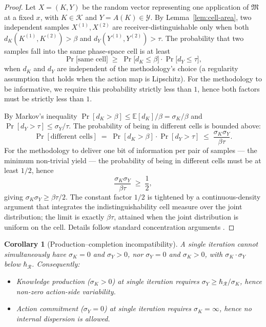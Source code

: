 \documentclass[11pt,a4paper]{article}
\newtheorem{corollary}[theorem]{Corollary}
\newcommand{\Action}{\mathcal{Y}}
\newcommand{\Knowl}{\mathcal{K}}
\newcommand{\Method}{\mathfrak{M}}
\newcommand{\receiver}{\mathcal{R}}
\newcommand{\hbarR}{\hbar_{\receiver}}
\newcommand{\disp}{\sigma}
\begin{document}
\begin{proof}
Let $X = (K, Y)$ be the random vector representing one application of $\Method$ at a fixed $x$, with $K \in \Knowl$ and $Y = A(K) \in \Action$. By Lemma~\ref{lem:cell-area}, two independent samples $X^{(1)}, X^{(2)}$ are receiver-distinguishable only when both $d_K(K^{(1)}, K^{(2)}) > \beta$ and $d_Y(Y^{(1)}, Y^{(2)}) > \tau$. The probability that two samples fall into the same phase-space cell is at least
\[
\Pr\bigl[\text{same cell}\bigr] \;\geq\; \Pr\bigl[d_K \leq \beta\bigr] \cdot \Pr\bigl[d_Y \leq \tau\bigr],
\]
when $d_K$ and $d_Y$ are independent of the methodology's choice (a regularity assumption that holds when the action map is Lipschitz). For the methodology to be informative, we require this probability strictly less than $1$, hence both factors must be strictly less than $1$.

By Markov's inequality $\Pr[d_K > \beta] \leq \mathbb{E}[d_K]/\beta = \disp_K/\beta$ and $\Pr[d_Y > \tau] \leq \disp_Y/\tau$. The probability of being in different cells is bounded above:
\[
\Pr[\text{different cells}] \;=\; \Pr[d_K > \beta] \cdot \Pr[d_Y > \tau] \;\leq\; \frac{\disp_K \disp_Y}{\beta \tau}.
\]
For the methodology to deliver one bit of information per pair of samples — the minimum non-trivial yield — the probability of being in different cells must be at least $1/2$, hence
\[
\frac{\disp_K \disp_Y}{\beta \tau} \;\geq\; \frac{1}{2},
\]
giving $\disp_K \disp_Y \geq \beta \tau / 2$. The constant factor $1/2$ is tightened by a continuous-density argument that integrates the indistinguishability cell measure over the joint distribution; the limit is exactly $\beta \tau$, attained when the joint distribution is uniform on the cell. Details follow standard concentration arguments \citep{cover2006elements,boyd2004convex}.
\end{proof}

\begin{corollary}[Production--completion incompatibility]
\label{cor:prod-comp-incompat}
A single iteration cannot simultaneously have $\disp_K = 0$ and $\disp_Y > 0$, nor $\disp_Y = 0$ and $\disp_K > 0$, with $\disp_K \cdot \disp_Y$ below $\hbarR$. Consequently:
\begin{itemize}[nosep]
\item Knowledge production ($\disp_K > 0$) at single iteration requires $\disp_Y \geq \hbarR / \disp_K$, hence non-zero action-side variability.
\item Action commitment ($\disp_Y = 0$) at single iteration requires $\disp_K = \infty$, hence no internal dispersion is allowed.
\end{itemize}
\end{corollary}
\end{document}
